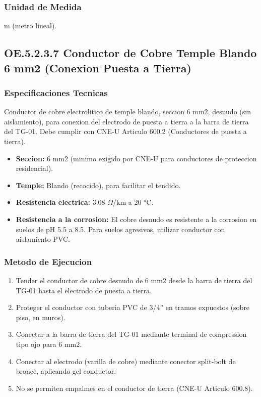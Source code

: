 \subsubsection{Unidad de Medida}

m (metro lineal).

\subsection{OE.5.2.3.7 Conductor de Cobre Temple Blando 6 mm2 (Conexion Puesta a Tierra)}

\subsubsection{Especificaciones Tecnicas}

Conductor de cobre electrolitico de temple blando, seccion 6 mm2, desnudo (sin aislamiento), para conexion del electrodo de puesta a tierra a la barra de tierra del TG-01. Debe cumplir con CNE-U Articulo 600.2 (Conductores de puesta a tierra).

\begin{itemize}[nosep]
  \item \textbf{Seccion:} 6 mm2 (minimo exigido por CNE-U para conductores de proteccion residencial).
  \item \textbf{Temple:} Blando (recocido), para facilitar el tendido.
  \item \textbf{Resistencia electrica:} 3.08 $\Omega$/km a 20 °C.
  \item \textbf{Resistencia a la corrosion:} El cobre desnudo es resistente a la corrosion en suelos de pH 5.5 a 8.5. Para suelos agresivos, utilizar conductor con aislamiento PVC.
\end{itemize}

\subsubsection{Metodo de Ejecucion}

\begin{enumerate}
  \item Tender el conductor de cobre desnudo de 6 mm2 desde la barra de tierra del TG-01 hasta el electrodo de puesta a tierra.
  \item Proteger el conductor con tuberia PVC de 3/4'' en tramos expuestos (sobre piso, en muros).
  \item Conectar a la barra de tierra del TG-01 mediante terminal de compression tipo ojo para 6 mm2.
  \item Conectar al electrodo (varilla de cobre) mediante conector split-bolt de bronce, aplicando gel conductor.
  \item No se permiten empalmes en el conductor de tierra (CNE-U Articulo 600.8).
\end{enumerate}


